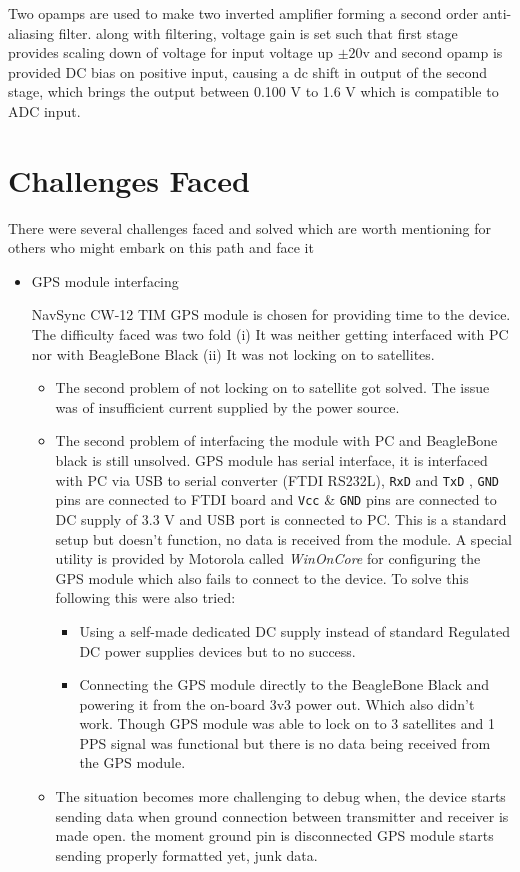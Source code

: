 Two opamps are used to make two inverted amplifier forming a second order anti-aliasing filter. along with filtering, voltage gain is set such that first stage provides scaling down of voltage for input voltage up $ \pm 20$v and second opamp is provided DC bias on positive input, causing a dc shift in output of the second stage, which brings the output between 0.100 V to 1.6 V which is compatible to ADC input.

\section{Challenges Faced}
There were several challenges faced and solved which are worth mentioning for others who might embark on this path and face it

\begin{itemize}
	\item GPS module interfacing
	
	NavSync CW-12 TIM GPS module is chosen for providing time to the device. The difficulty faced was two fold (i) It was neither getting interfaced with PC nor with BeagleBone Black (ii) It was not locking on to satellites. 
	\begin{itemize}
		\item The second problem of not locking on to satellite got solved. The issue was of insufficient current supplied by the power source.
		\item The second problem of interfacing the module with PC and BeagleBone black is still unsolved. GPS module has serial interface, it is interfaced with PC via USB to serial converter (FTDI RS232L), \texttt{RxD} and \texttt{TxD} , \texttt{GND} pins are connected to FTDI board and \texttt{Vcc} \& \texttt{GND} pins are connected to DC supply of 3.3 V and USB port is connected to PC. This is a standard setup but doesn't function, no data is received from the module. A special utility is provided by Motorola called \textit{WinOnCore} for configuring the GPS module which also fails to connect to the device. To solve this following this were also tried:
		\begin{itemize}
			\item Using a self-made dedicated DC supply instead of standard Regulated DC power supplies devices but to no success.
			\item Connecting the GPS module directly to the BeagleBone Black and powering it from the on-board 3v3 power out. Which also didn't work. Though GPS module was able to lock on to 3 satellites and 1 PPS signal was functional but there is no data being received from the GPS module.
		\end{itemize}   
	\item The situation becomes more challenging to debug when, the device starts sending data when ground connection between transmitter and receiver is made open. the moment ground pin is disconnected GPS module starts sending properly formatted yet, junk data.
	\end{itemize} 
	

\end{itemize}
